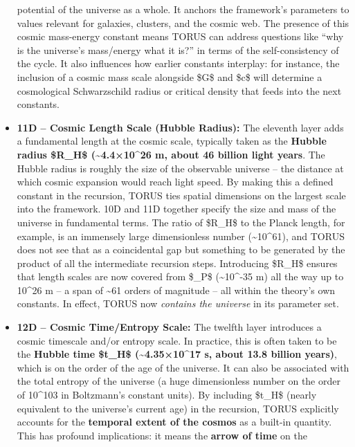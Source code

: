 \documentclass[
]{article}
\begin{document}
\begin{itemize}
  potential of the universe as a whole. It anchors the framework's
  parameters to values relevant for galaxies, clusters, and the cosmic
  web. The presence of this cosmic mass-energy constant means TORUS can
  address questions like ``why is the universe's mass/energy what it
  is?'' in terms of the self-consistency of the cycle. It also
  influences how earlier constants interplay: for instance, the
  inclusion of a cosmic mass scale alongside \$G\$ and \$c\$ will
  determine a cosmological Schwarzschild radius or critical density that
  feeds into the next constants.
\item
  \textbf{11D -- Cosmic Length Scale (Hubble Radius):} The eleventh
  layer adds a fundamental length at the cosmic scale, typically taken
  as the \textbf{Hubble radius \$R\_H\$ (\textasciitilde4.4×10\^{}26 m,
  about 46 billion light years}. The Hubble radius is roughly the size
  of the observable universe -- the distance at which cosmic expansion
  would reach light speed. By making this a defined constant in the
  recursion, TORUS ties spatial dimensions on the largest scale into the
  framework. 10D and 11D together specify the size and mass of the
  universe in fundamental terms. The ratio of \$R\_H\$ to the Planck
  length, for example, is an immensely large dimensionless number
  (\textasciitilde10\^{}61), and TORUS does not see that as a
  coincidental gap but something to be generated by the product of all
  the intermediate recursion steps. Introducing \$R\_H\$ ensures that
  length scales are now covered from \$\ell\_P\$ (\textasciitilde10\^{}-35
  m) all the way up to 10\^{}26 m -- a span of \textasciitilde61 orders
  of magnitude -- all within the theory's own constants. In effect,
  TORUS now \emph{contains the universe} in its parameter set.
\item
  \textbf{12D -- Cosmic Time/Entropy Scale:} The twelfth layer
  introduces a cosmic timescale and/or entropy scale. In practice, this
  is often taken to be the \textbf{Hubble time \$t\_H\$
  (\textasciitilde4.35×10\^{}17 s, about 13.8 billion years)}, which is
  on the order of the age of the universe\hspace{0pt}. It can also be
  associated with the total entropy of the universe (a huge
  dimensionless number on the order of 10\^{}103 in Boltzmann's constant
  units). By including \$t\_H\$ (nearly equivalent to the universe's
  current age) in the recursion, TORUS explicitly accounts for the
  \textbf{temporal extent of the cosmos} as a built-in quantity. This
  has profound implications: it means the \textbf{arrow of time} on the

\end{itemize}
\end{document}
